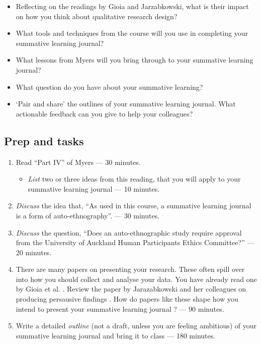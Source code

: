 \documentclass[]{book}
\providecommand{\tightlist}{%
  \setlength{\itemsep}{0pt}\setlength{\parskip}{0pt}}
\theoremstyle{definition}
\theoremstyle{definition}
\theoremstyle{definition}
\theoremstyle{remark}
\begin{document}
\begin{itemize}
\item
  Reflecting on the readings by Gioia and Jarzabkowski, what is their
  impact on how you think about qualitative research design?
\item
  What tools and techniques from the course will you use in completing
  your summative learning journal?
\item
  What lessons from Myers \autocite*[
  p.~221--250]{myers_2013_qualitativeresearchbusiness} will you bring
  through to your summative learning journal?
\item
  What question do you have about your summative learning?
\item
  `Pair and share' the outlines of your summative learning journal. What
  actionable feedback can you give to help your colleagues?
\end{itemize}

\hypertarget{prep-and-tasks-10}{%
\subsection*{Prep and tasks}\label{prep-and-tasks-10}}

\begin{enumerate}
\def\labelenumi{\arabic{enumi}.}
\item
  Read ``Part IV'' of Myers \autocite*[
  p.~221--250]{myers_2013_qualitativeresearchbusiness} --- 30 minutes.

  \begin{itemize}
  \tightlist
  \item
    \emph{List} two or three ideas from this reading, that you will
    apply to your summative learning journal --- 10 minutes.
  \end{itemize}
\item
  \emph{Discuss} the idea that, ``As used in this course, a summative
  learning journal is a form of auto-ethnography''. --- 30 minutes.
\item
  \emph{Discuss} the question, ``Does an auto-ethnographic study require
  approval from the University of Auckland Human Participants Ethics
  Committee?'' --- 20 minutes.
\item
  There are many papers on presenting your research. These often spill
  over into how you should collect and analyse your data. You have
  already read one by Gioia et al.
  \autocite*{gioia_2013_seekingqualitativerigor}. Review the paper by
  Jarazabkowski and her colleagues on producing persausive findings
  \autocite{jarzabkowski_2014_producingpersuasivefindings}. How do
  papers like these shape how you intend to present your summative
  learning journal ? --- 90 minutes.
\item
  Write a detailed \emph{outline} (not a draft, unless you are feeling
  ambitious) of your summative learning journal and bring it to class
  --- 180 minutes.
\end{enumerate}
\end{document}
